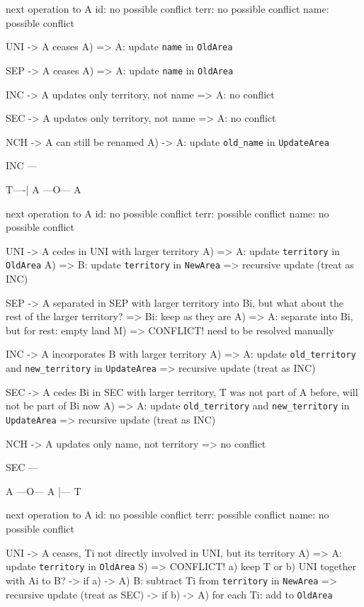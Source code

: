 next operation to A
  id:   no possible conflict
  terr: no possible conflict
  name: possible conflict

  UNI -> A ceases
A)    => A: update \texttt{name} in \texttt{OldArea}

  SEP -> A ceases
A)    => A: update \texttt{name} in \texttt{OldArea}

  INC -> A updates only territory, not name
      => A: no conflict

  SEC -> A updates only territory, not name
      => A: no conflict

  NCH -> A can still be renamed
A)    -> A: update \texttt{old\_name} in \texttt{UpdateArea}


INC
---

T----|
A ---O--- A

next operation to A
  id:   no possible conflict
  terr: possible conflict
  name: no possible conflict

  UNI -> A cedes in UNI with larger territory
A)    => A: update \texttt{territory} in \texttt{OldArea}
A)    => B: update \texttt{territory} in \texttt{NewArea}
        => recursive update (treat as INC)

  SEP -> A separated in SEP with larger territory into Bi, but what about the rest of the larger territory?
      => Bi: keep as they are
A)    => A: separate into Bi, but for rest: empty land
M)      => CONFLICT! need to be resolved manually

  INC -> A incorporates B with larger territory
A)    => A: update \texttt{old\_territory} and \texttt{new\_territory} in \texttt{UpdateArea}
        => recursive update (treat as INC)

  SEC -> A cedes Bi in SEC with larger territory, T was not part of A before, will not be part of Bi now
A)    => A: update \texttt{old\_territory} and \texttt{new\_territory} in \texttt{UpdateArea}
        => recursive update (treat as INC)

  NCH -> A updates only name, not territory
      => no conflict


SEC
---

A ---O--- A
     |--- T

next operation to A
  id:   no possible conflict
  terr: possible conflict
  name: no possible conflict

  UNI -> A ceases, Ti not directly involved in UNI, but its territory
A)    => A: update \texttt{territory} in \texttt{OldArea}
S)    => CONFLICT! a) keep T or b) UNI together with Ai to B?
      -> if a)
-> A)   B: subtract Ti from \texttt{territory} in \texttt{NewArea}
          => recursive update (treat as SEC)
      -> if b)
-> A)   for each Ti: add to \texttt{OldArea}

